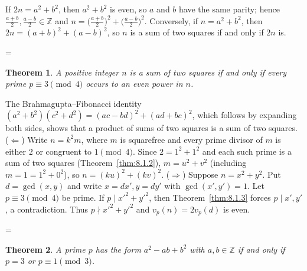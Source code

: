 \documentclass[11pt]{article}
\makeatletter
\theoremstyle{ntstyle}
\newtheorem{theorem}{Theorem}[subsection]
\let\nt@closedisplay\]
\def\nt@guardedclose{\@ifnextchar\par{\nt@closeafterpar}{\@ifnextchar\end{\postdisplaypenalty\@M\nt@closedisplay}{\nt@closedisplay}}}
\def\nt@closeafterpar\par{\@ifnextchar\par{\nt@closeafterpar}{\@ifnextchar\end{\postdisplaypenalty\@M\nt@closedisplay\par}{\nt@closedisplay\par}}}
\renewenvironment{proof}[1][\proofname]{\par
  \pushQED{\qed}\normalfont\topsep\medskipamount\edef\nt@afterproof{\@endparpenalty=\the\@endparpenalty\relax}\@beginparpenalty\@M\@endparpenalty\@M\let\]\nt@guardedclose\trivlist\item[]\textit{#1\@addpunct{.}} \ignorespaces}{\ifvmode\addpenalty\@M\fi\popQED\nt@afterproof\endtrivlist\@endpefalse}
\makeatother
\begin{document}
\begin{proof} If $2n = a^{2} + b^{2}$, then $a^{2} +
		b^{2}$ is even, so $a$ and $b$ have the same parity; hence
	$\tfrac{a+b}{2}, \tfrac{a-b}{2} \in \mathbb{Z}$ and $n =
		\big(\tfrac{a+b}{2}\big)^{2} + \big(\tfrac{a-b}{2}\big)^{2}$.
	Conversely, if $n = a^{2} + b^{2}$, then $2n = (a+b)^{2} + (a-b)^{2}$,
	so $n$ is a sum of two squares if and only if $2n$ is.

\end{proof}
\begin{theorem}\label{thm:8.1.5} A positive
	integer $n$ is a sum of two squares if and only if every prime $p
		\equiv 3 \pmod{4}$ occurs to an even power in $n$.

\end{theorem}

\begin{proof} The Brahmagupta--Fibonacci identity $(a^2 +
		b^2)(c^2 + d^2) = (ac - bd)^2 + (ad + bc)^2$, which follows by expanding both sides, shows that a product of sums
	of two squares is a sum of two squares. ($\Leftarrow$) Write $n=k^2m$, where $m$ is squarefree and every prime divisor
	of $m$ is either $2$ or congruent to $1\pmod{4}$. Since $2
		= 1^2 + 1^2$ and each such prime is a sum of two squares (Theorem~\ref{thm:8.1.2}), $m = u^2 + v^2$ (including $m=1=1^2+0^2$), so $n = (ku)^2 + (kv)^2$. ($\Rightarrow$) Suppose
	$n = x^2 + y^2$. Put $d = \gcd(x, y)$ and write $x = dx', y = dy'$ with $\gcd(x', y') = 1$. Let $p \equiv 3 \pmod{4}$ be prime. If $p \mid x'^2 + y'^2$, then Theorem~\ref{thm:8.1.3} forces $p \mid x', y'$, a contradiction. Thus $p \nmid x'^2 + y'^2$
	and $v_p(n) = 2v_p(d)$ is even.\qedhere

\end{proof}
\begin{theorem}\label{thm:8.1.6} A
	prime $p$ has the form $a^2 - ab + b^2$ with $a, b \in \mathbb{Z}$ if
	and only if $p = 3$ or $p \equiv 1 \pmod{3}$.

\end{theorem}
\end{document}

